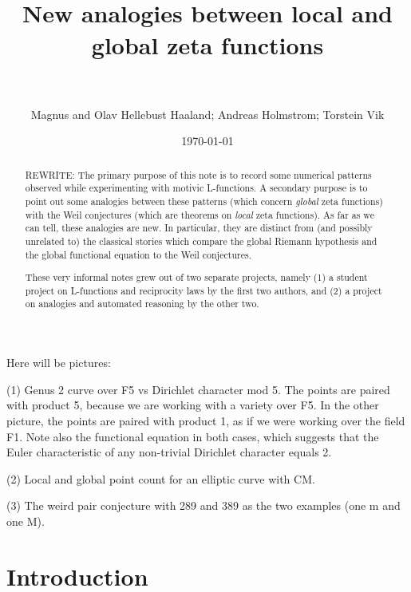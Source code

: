 \documentclass[paper=a4, fontsize=11pt]{scrartcl} %
\title{
\normalfont \normalsize
\horrule{0.5pt} \\[0.4cm] %
\LARGE New analogies between local and global zeta functions \\ %
\horrule{2pt} \\[0.5cm] %
}
\author{Magnus and Olav Hellebust Haaland; Andreas Holmstrom; Torstein Vik} %
\date{\normalsize\today} %
\numberwithin{equation}{section} %
\numberwithin{figure}{section} %
\numberwithin{table}{section} %
\begin{document}
\maketitle %


\begin{abstract}

REWRITE: The primary purpose of this note is to record some numerical patterns observed while experimenting with motivic L-functions. A secondary purpose is to point out some analogies between these patterns (which concern \emph{global} zeta functions) with the Weil conjectures (which are theorems on \emph{local} zeta functions). As far as we can tell, these analogies are new. In particular, they are distinct from (and possibly unrelated to) the classical stories which compare the global Riemann hypothesis and the global functional equation to the Weil conjectures.

These very informal notes grew out of two separate projects, namely (1) a student project on L-functions and reciprocity laws by the first two authors, and (2) a project on analogies and automated reasoning by the other two.


\end{abstract}

\tableofcontents

\newpage

Here will be pictures:

(1) Genus 2 curve over F5 vs Dirichlet character mod 5. The points are paired with product 5, because we are working with a variety over F5. In the other picture, the points are paired with product 1, as if we were working over the field F1. Note also the functional equation in both cases, which suggests that the Euler characteristic of any non-trivial Dirichlet character equals 2.

(2) Local and global point count for an elliptic curve with CM.

(3) The weird pair conjecture with 289 and 389 as the two examples (one m and one M).



\newpage

\section{Introduction}
\end{document}
